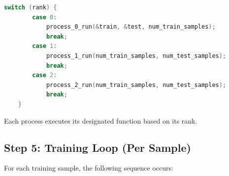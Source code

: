 \documentclass[11pt,a4paper]{article}
\begin{document}
\begin{lstlisting}[language=C, caption={Process dispatch based on rank}]
    switch (rank) {
        case 0:
            process_0_run(&train, &test, num_train_samples);
            break;
        case 1:
            process_1_run(num_train_samples, num_test_samples);
            break;
        case 2:
            process_2_run(num_train_samples, num_test_samples);
            break;
    }
\end{lstlisting}

Each process executes its designated function based on its rank.

\subsection{Step 5: Training Loop (Per Sample)}

For each training sample, the following sequence occurs:
\end{document}
